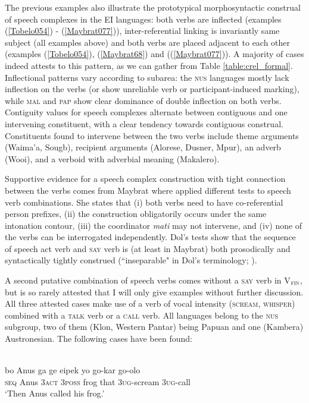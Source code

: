 The previous examples also illustrate the prototypical morphosyntactic construal of speech complexes in the EI languages: both verbs are inflected (examples (\ref{Tobelo054}) - (\ref{Maybrat077})), inter-referential linking is invariantly same subject (all examples above) and both verbs are placed adjacent to each other (examples (\ref{Tobelo054}), (\ref{Maybrat68}) and ((\ref{Maybrat077})). A majority of cases indeed attests to this pattern, as we can gather from Table \ref{table:crel_formal}. Inflectional patterns vary according to subarea: the \textsc{nus} languages mostly lack inflection on the verbs (or show unreliable verb or participant-induced marking), while \textsc{mal} and \textsc{pap} show clear dominance of double inflection on both verbs. Contiguity values for speech complexes alternate between contiguous and one intervening constituent, with a clear tendency towards contiguous construal. Constituents found to intervene between the two verbs include theme arguments (Waima'a, Sougb), recipient arguments (Alorese, Dusner, Mpur), an adverb (Wooi), and a verboid with adverbial meaning (Makalero).

Supportive evidence for a speech complex construction with tight connection between the verbs comes from Maybrat where \citet[202]{dol2007grammar} applied different tests to speech verb combinations. She states that (i) both verbs need to have co-referential person prefixes, (ii) the construction obligatorily occurs under the same intonation contour, (iii) the coordinator \textit{mati} may not intervene, and (iv) none of the verbs can be interrogated independently. Dol's tests show that the sequence of speech act verb and \textsc{say} verb is (at least in Maybrat) both prosodically and syntactically tightly construed (``inseparable" in Dol's terminology; \citealt[202]{dol2007grammar}).

A second putative combination of speech verbs comes without a \textsc{say} verb in V$_{\textsc{fin}}$, but is so rarely attested that I will only give examples without further discussion. All three attested cases make use of a verb of vocal intensity (\textsc{scream}, \textsc{whisper}) combined with a \textsc{talk} verb or a \textsc{call} verb. All languages belong to the \textsc{nus} subgroup, two of them (Klon, Western Pantar) being Papuan and one (Kambera) Austronesian. The following cases have been found:

\ea \label{Klon077}
\\
\gll bo Anus ga ge eipek yo go-kar go-olo \\
\textsc{seq} Anus \textsc{3}\textsc{act} \textsc{3}\textsc{poss} frog that \textsc{3}\textsc{ug}-scream \textsc{3}\textsc{ug}-call \\
\glft `Then Anus called his frog.' \\ 
\z

